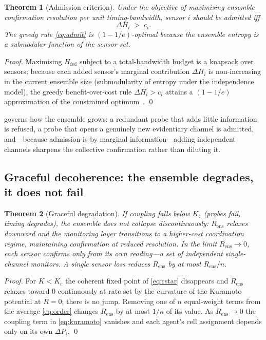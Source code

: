 \documentclass[11pt,a4paper,twocolumn]{article}
\theoremstyle{thmstyle}
\newtheorem{theorem}{Theorem}[section]
\theoremstyle{definition}
\theoremstyle{remark}
\newcommand{\DP}{\Delta P}
\newcommand{\Rens}{R_{\mathrm{ens}}}
\newcommand{\Kc}{K_{\mathrm{c}}}
\begin{document}
\begin{theorem}[Admission criterion]
\label{thm:admit}
Under the objective of maximising ensemble confirmation resolution per
unit timing-bandwidth, sensor $i$ should be admitted iff
\begin{equation}
\label{eq:admit}
\Delta H_i\;>\;c_i .
\end{equation}
The greedy rule \eqref{eq:admit} is $(1-1/e)$-optimal because the
ensemble entropy is a submodular function of the sensor set.
\end{theorem}

\begin{proof}
Maximising $H_{\mathrm{fed}}$ subject to a total-bandwidth budget is a
knapsack over sensors; because each added sensor's marginal contribution
$\Delta H_i$ is non-increasing in the current ensemble size (submodularity
of entropy under the independence model), the greedy benefit-over-cost
rule $\Delta H_i>c_i$ attains a $(1-1/e)$ approximation of the constrained
optimum~\citep{cover2006elements}. \qed
\end{proof}

 governs how the ensemble grows: a redundant probe that
adds little information is refused, a probe that opens a genuinely new
evidentiary channel is admitted, and---because admission is by marginal
information---adding independent channels sharpens the collective
confirmation rather than diluting it.

\subsection{Graceful decoherence: the ensemble degrades, it does not fail}

\begin{theorem}[Graceful degradation]
\label{thm:decohere}
If coupling falls below $\Kc$ (probes fail, timing degrades), the ensemble
does not collapse discontinuously: $\Rens$ relaxes downward and the
monitoring layer transitions to a higher-cost coordination regime,
maintaining confirmation at reduced resolution. In the limit
$\Rens\to0$, each sensor confirms only from its own reading---a set of
independent single-channel monitors. A single sensor loss reduces $\Rens$
by at most $\Rens/n$.
\end{theorem}

\begin{proof}
For $K<\Kc$ the coherent fixed point of \eqref{eq:rstar} disappears and
$\Rens$ relaxes toward $0$ continuously at rate set by the curvature of
the Kuramoto potential at $R=0$; there is no jump. Removing one of $n$
equal-weight terms from the average \eqref{eq:order} changes $\Rens$ by at
most $1/n$ of its value. As $\Rens\to0$ the coupling term in
\eqref{eq:kuramoto} vanishes and each agent's cell assignment depends
only on its own $\DP_i$. \qed
\end{proof}
\end{document}
